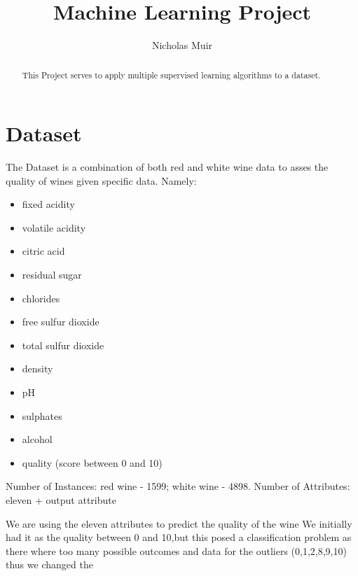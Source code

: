 \documentclass{article}
\title{Machine Learning Project}
\author{Nicholas Muir}
\begin{document}
\maketitle
\begin{abstract}
This Project serves to apply multiple supervised learning algorithms to a dataset.
\end{abstract}



\section{Dataset}

The Dataset is a combination of both red and white wine data to asses the quality of wines given specific data.
Namely:

\begin{itemize}
\item fixed acidity
\item volatile acidity
\item citric acid
\item residual sugar
\item chlorides
\item free sulfur dioxide
\item total sulfur dioxide
\item density
\item pH
\item sulphates
\item alcohol
\item quality (score between 0 and 10)
\end{itemize}

Number of Instances: red wine - 1599; white wine - 4898.
Number of Attributes: eleven + output attribute

We are using the eleven attributes to predict the quality of the wine
We initially had it as the quality between 0 and 10,but this posed a classification problem as there where too many possible outcomes and data for the outliers (0,1,2,8,9,10) thus we changed the
\end{document}
